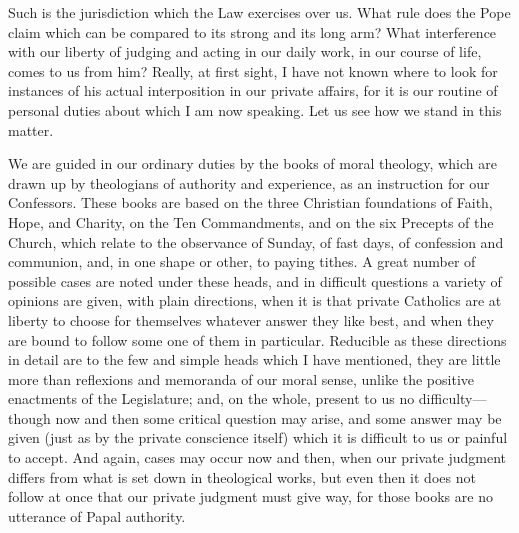 Such is the jurisdiction which the Law exercises over us. What rule
does the Pope claim which can be compared to its strong and its long
arm? What interference with our liberty of judging and acting in our
daily work, in our course of life, comes to us from him? Really, at
first sight, I have not known where to look for instances of his actual
interposition in our private affairs, for it is our routine of personal
duties about which I am now speaking. Let us see how we stand in this
matter.

We are guided in our ordinary duties by the books of moral theology,
which are drawn up by theologians of authority and experience, as an
instruction for our Confessors. These books are based on the three
Christian foundations of Faith, Hope, and Charity, on the Ten
Commandments, and on the six Precepts of the Church, which relate to the
observance of Sunday, of fast days, of confession and communion, and, in
one shape or other, to paying tithes. A great number of possible cases
are noted under these heads, and in difficult questions a variety of
opinions are given, with plain directions, when it is that private
Catholics are at liberty to choose for themselves whatever answer they
like best, and when they are bound to follow some one of them in
particular. Reducible as these directions in detail are to the few and
simple heads which I have mentioned, they are little more than
reflexions and memoranda of our moral sense, unlike the positive
enactments of the Legislature; and, on the whole, present to us no
difficulty—though now and then some critical question may arise, and
some answer may be given (just as by the private conscience itself)
which it is difficult to us or painful to accept. And again, cases may
occur now and then, when our private judgment differs from what is set
down in theological works, but even then it does not follow at once that
our private judgment must give way, for those books are no utterance of
Papal authority.

